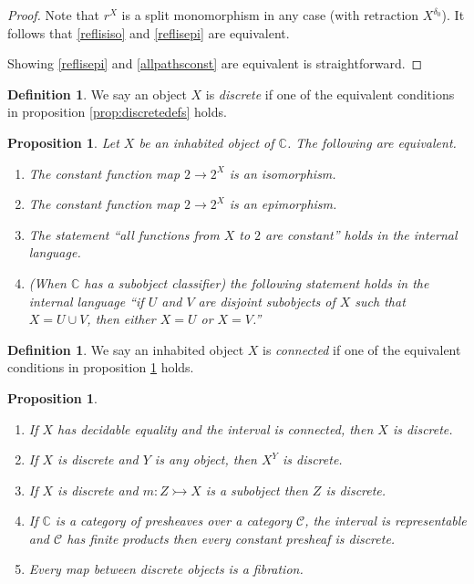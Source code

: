 \documentclass[a4paper]{amsart}
\newtheorem{proposition}[theorem]{Proposition}
\theoremstyle{definition}
\newtheorem{definition}[theorem]{Definition}
\newcommand{\cat}[1]{\mathbb{#1}}
\newcommand{\catc}{\cat{C}}
\newcommand{\smcat}[1]{\mathcal{#1}}
\begin{document}
\begin{proof}
  Note that $r^X$ is a split monomorphism in any case (with retraction
  $X^{\delta_0}$). It follows that \ref{reflisiso} and \ref{reflisepi}
  are equivalent.

  Showing \ref{reflisepi} and \ref{allpathsconst} are equivalent is
  straightforward.
\end{proof}

\begin{definition}
  We say an object $X$ is \emph{discrete} if one of the equivalent
  conditions in proposition \ref{prop:discretedefs} holds.
\end{definition}

\begin{proposition}
  \label{prop:connecteddefs}
  Let $X$ be an inhabited object of $\catc$. The following are
  equivalent.
  \begin{enumerate}
  \item The constant function map $2 \to 2^X$ is an isomorphism.
  \item The constant function map $2 \to 2^X$ is an epimorphism.
  \item The statement ``all functions from $X$ to $2$ are constant''
    holds in the internal language.
  \item (When $\catc$ has a subobject classifier) the following
    statement holds in the internal language ``if $U$ and $V$ are
    disjoint subobjects of $X$ such that $X = U \cup V$, then either
    $X = U$ or $X = V$.''
  \end{enumerate}
\end{proposition}

\begin{definition}
  We say an inhabited object $X$ is \emph{connected} if one of the
  equivalent conditions in proposition \ref{prop:connecteddefs} holds.
\end{definition}

\begin{proposition}
  \label{prop:discreteproperties}
  \begin{enumerate}
  \item If $X$ has decidable equality and the interval is connected,
    then $X$ is discrete.
  \item If $X$ is discrete and $Y$ is any object, then $X^Y$ is
    discrete.
  \item If $X$ is discrete and $m \colon Z \rightarrowtail X$ is a
    subobject then $Z$ is discrete.
  \item \label{repintvconstdisc}
    If $\catc$ is a category of presheaves over a category
    $\smcat{C}$, the interval is representable and $\smcat{C}$ has
    finite products then every constant presheaf is discrete.
  \item \label{mapbtwndiscisfib}
    Every map between discrete objects is a fibration.
  \end{enumerate}
\end{proposition}
\end{document}
